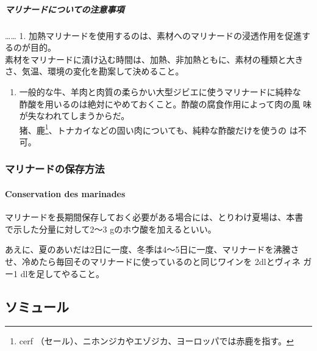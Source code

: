\begin{recette}
\hypertarget{observation-sur-les-marinades}{%
\subparagraph{マリナードについての注意事項}\label{observation-sur-les-marinades}}

\ldots{}\ldots{} 1.
加熱マリナードを使用するのは、素材へのマリナードの浸透作用を促進するのが目的。\\
素材をマリナードに漬け込む時間は、加熱、非加熱ともに、素材の種類と大き
さ、気温、環境の変化を勘案して決めること。

\begin{enumerate}
\def\labelenumi{\arabic{enumi}.}
\setcounter{enumi}{1}
\tightlist
\item
  一般的な牛、羊肉と肉質の柔らかい大型ジビエに使うマリナードに純粋な
  酢酸を用いるのは絶対にやめておくこと。酢酸の腐食作用によって肉の風
  味が失なわれてしまうからだ。\\
  猪、鹿\footnote{cerf
    （セール）、ニホンジカやエゾジカ、ヨーロッパでは赤鹿を指す。}、トナカイなどの固い肉についても、純粋な酢酸だけを使うの
  は不可。
\end{enumerate}

\hypertarget{ux30deux30eaux30caux30fcux30c9ux306eux4fddux5b58ux65b9ux6cd5}{%
\subsubsection{マリナードの保存方法}\label{ux30deux30eaux30caux30fcux30c9ux306eux4fddux5b58ux65b9ux6cd5}}

\hypertarget{conservation-des-marinades}{%
\paragraph{Conservation des
marinades}\label{conservation-des-marinades}}


マリナードを長期間保存しておく必要がある場合には、とりわけ夏場は、本書
で示した分量に対して2〜3 gのホウ酸を加えるといい。

あえに、夏のあいだは2日に一度、冬季は4〜5日に一度、マリナードを沸騰さ
せ、冷めたら毎回そのマリナードに使っているのと同じワインを 2dlとヴィネ
ガー1 dlを足してやること。
\end{recette}
\hypertarget{ux30bdux30dfux30e5ux30fcux30eb}{%
\subsection{ソミュール}\label{ux30bdux30dfux30e5ux30fcux30eb}}

